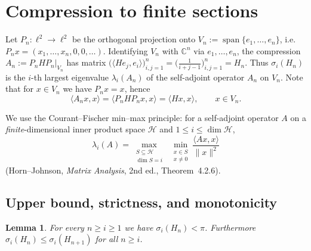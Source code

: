 \documentclass[12pt]{article}
\newtheorem{lemma}{Lemma}
\theoremstyle{remark}
\begin{document}
\section{Compression to finite sections}

Let $P_n\colon\ell^2\to\ell^2$ be the orthogonal projection onto
$V_n:=\operatorname{span}\{e_1,\dots,e_n\}$, i.e.\ $P_nx=(x_1,\dots,x_n,0,0,\dots)$. Identifying
$V_n$ with $\mathbb{C}^n$ via $e_1,\dots,e_n$, the compression $A_n:=P_nHP_n|_{V_n}$ has matrix
$\bigl(\langle He_j,e_i\rangle\bigr)_{i,j=1}^n=\bigl(\tfrac1{i+j-1}\bigr)_{i,j=1}^n=H_n$. Thus
$\sigma_i(H_n)$ is the $i$-th largest eigenvalue $\lambda_i(A_n)$ of the self-adjoint operator
$A_n$ on $V_n$. Note that for $x\in V_n$ we have $P_nx=x$, hence
\begin{equation}\label{eq:rayleigh}
\langle A_n x,x\rangle=\langle P_nHP_n x,x\rangle=\langle Hx,x\rangle ,\qquad x\in V_n .
\end{equation}

We use the Courant--Fischer min--max principle: for a self-adjoint operator $A$ on a
\emph{finite}-dimensional inner product space $\mathcal H$ and $1\le i\le\dim\mathcal H$,
\begin{equation}\label{eq:minmax}
\lambda_i(A)=\max_{\substack{S\subseteq \mathcal H \\ \dim S=i}}\ \min_{\substack{x\in S\\ x\neq0}}
\frac{\langle Ax,x\rangle}{\|x\|^2}
\end{equation}
(Horn--Johnson, \emph{Matrix Analysis}, 2nd ed., Theorem~4.2.6).

\subsection{Upper bound, strictness, and monotonicity}

\begin{lemma}\label{lem:upper}
For every $n\ge i\ge1$ we have $\sigma_i(H_n)<\pi$. Furthermore
$\sigma_i(H_{n})\le\sigma_i(H_{n+1})$ for all $n\ge i$.
\end{lemma}
\end{document}
